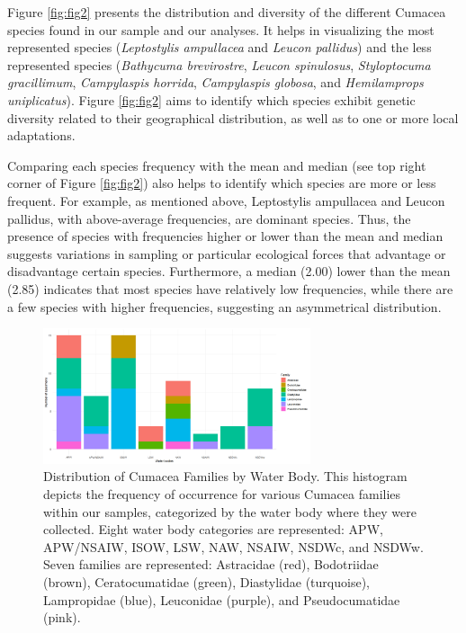 Figure \ref{fig:fig2} presents the distribution and diversity of the different Cumacea species found in our sample and our analyses. It helps in visualizing the most represented species (\emph{Leptostylis ampullacea} and \emph{Leucon pallidus}) and the less represented species (\emph{Bathycuma brevirostre}, \emph{Leucon spinulosus}, \emph{Styloptocuma gracillimum}, \emph{Campylaspis horrida}, \emph{Campylaspis globosa}, and \emph{Hemilamprops uniplicatus}). Figure \ref{fig:fig2} aims to identify which species exhibit genetic diversity related to their geographical distribution, as well as to one or more local adaptations.

Comparing each species frequency with the mean and median (see top right corner of Figure \ref{fig:fig2}) also helps to identify which species are more or less frequent. For example, as mentioned above, Leptostylis ampullacea and Leucon pallidus, with above-average frequencies, are dominant species. Thus, the presence of species with frequencies higher or lower than the mean and median suggests variations in sampling or particular ecological forces that advantage or disadvantage certain species. Furthermore, a median (2.00) lower than the mean (2.85) indicates that most species have relatively low frequencies, while there are a few species with higher frequencies, suggesting an asymmetrical distribution. 

\begin{figure}[htbp]
    \centering
    \includegraphics[width=0.7\textwidth]{figure3.png}
    \caption{Distribution of Cumacea Families by Water Body. This histogram depicts the frequency of occurrence for various Cumacea families within our samples, categorized by the water body where they were collected. Eight water body categories are represented: APW, APW/NSAIW, ISOW, LSW, NAW, NSAIW, NSDWc, and NSDWw. Seven families are represented: Astracidae (red), Bodotriidae (brown), Ceratocumatidae (green), Diastylidae (turquoise), Lampropidae (blue), Leuconidae (purple), and Pseudocumatidae (pink). \label{fig:fig3}}
\end{figure}

